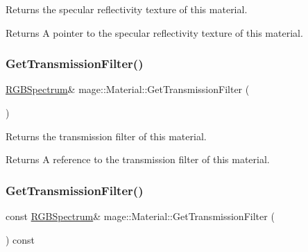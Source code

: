 Returns the specular reflectivity texture of this material.

\begin{DoxyReturn}{Returns}
A pointer to the specular reflectivity texture of this material. 
\end{DoxyReturn}
\hypertarget{structmage_1_1_material_aba949cb74176530638c7bcb100882196}{}\label{structmage_1_1_material_aba949cb74176530638c7bcb100882196} 
\subsubsection{\texorpdfstring{Get\+Transmission\+Filter()}{GetTransmissionFilter()}\hspace{0.1cm}{\footnotesize\ttfamily [1/2]}}
{\footnotesize\ttfamily \hyperlink{structmage_1_1_r_g_b_spectrum}{R\+G\+B\+Spectrum}\& mage\+::\+Material\+::\+Get\+Transmission\+Filter (\begin{DoxyParamCaption}{ }\end{DoxyParamCaption})\hspace{0.3cm}{\ttfamily [noexcept]}}

Returns the transmission filter of this material.

\begin{DoxyReturn}{Returns}
A reference to the transmission filter of this material. 
\end{DoxyReturn}
\hypertarget{structmage_1_1_material_a38071483e6d47eedb02b2e5c912073e7}{}\label{structmage_1_1_material_a38071483e6d47eedb02b2e5c912073e7} 
\subsubsection{\texorpdfstring{Get\+Transmission\+Filter()}{GetTransmissionFilter()}\hspace{0.1cm}{\footnotesize\ttfamily [2/2]}}
{\footnotesize\ttfamily const \hyperlink{structmage_1_1_r_g_b_spectrum}{R\+G\+B\+Spectrum}\& mage\+::\+Material\+::\+Get\+Transmission\+Filter (\begin{DoxyParamCaption}{ }\end{DoxyParamCaption}) const\hspace{0.3cm}{\ttfamily [noexcept]}}

